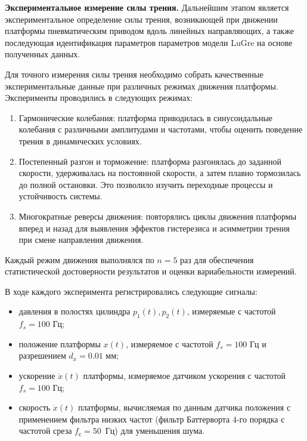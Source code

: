 \textbf{Экспериментальное измерение силы трения.}
Дальнейшим этапом является экспериментальное определение силы трения, возникающей при движении платформы
пневматическим приводом вдоль линейных направляющих, а также последующая идентификация
параметров параметров модели LuGre на основе полученных данных.

Для точного измерения силы трения необходимо собрать качественные экспериментальные данные
при различных режимах движения платформы. Эксперименты проводились в следующих режимах:

\begin{enumerate}
	\item Гармонические колебания: платформа приводилась в синусоидальные колебания
	      с различными амплитудами и частотами, чтобы оценить поведение трения в динамических условиях.

	\item Постепенный разгон и торможение: платформа разгонялась до заданной скорости,
	      удерживалась на постоянной скорости, а затем плавно тормозилась до
	      полной остановки. Это позволило изучить переходные процессы и устойчивость системы.

	\item Многократные реверсы движения: повторялись циклы движения платформы вперед и
	      назад для выявления эффектов гистерезиса и асимметрии трения при смене направления движения.
\end{enumerate}

Каждый режим движения выполнялся по $n = 5$ раз для обеспечения статистической
достоверности результатов и оценки вариабельности измерений.

В ходе каждого эксперимента регистрировались следующие сигналы:
\begin{itemize}
	\item давления в полостях цилиндра $p_1(t), p_2(t)$, измеряемые с частотой $f_s = 100$ Гц;
	\item положение платформы $x(t)$, измеряемое с частотой $f_s = 100$ Гц и разрешением $d_x = 0.01$ мм;
	\item ускорение $\ddot{x}(t)$ платформы, измеряемое датчиком ускорения с частотой $f_s = 100$ Гц;
	\item скорость $\dot{x}(t)$ платформы, вычисляемая по данным датчика положения с применением фильтра
	      низких частот (фильтр Баттерворта 4-го порядка с частотой среза $f_\text{с} = 50$~Гц) для уменьшения шума.
\end{itemize}

